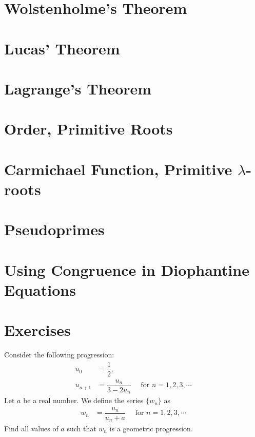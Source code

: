 \documentclass{subfile}
\begin{document}
	\section{Wolstenholme's Theorem}
		
	\section{Lucas' Theorem}
		
	\section{Lagrange's Theorem}
		
	\section{Order, Primitive Roots} \label{sec:order}
		
	\section{Carmichael Function, Primitive \texorpdfstring{$\lambda$}{L}-roots}
		
	\section{Pseudoprimes} \label{sec:pseudoprimes}
		
	\section{Using Congruence in Diophantine Equations}
		

		\newpage
		\section{Exercises}

	\begin{problem} %
		Consider the following progression:
			\begin{align*}
				u_0 &= \dfrac{1}{2},\\
				u_{n+1} &= \dfrac{u_n}{3-2u_n} \quad \mbox{ for } n=1,2,3,\cdots
			\end{align*}
		Let $a$ be a real number. We define the series $\{w_n\}$ as
			\begin{align*}
				w_n &= \dfrac{u_n}{u_n + a} \quad \text{ for } n=1,2,3,\cdots
			\end{align*}
		Find all values of $a$ such that $w_n$ is a geometric progression.
	\end{problem}
\end{document}
